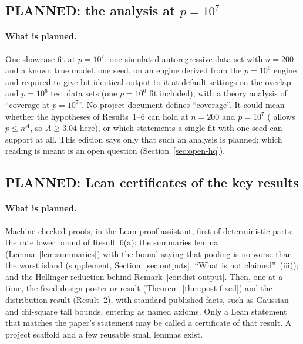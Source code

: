 \subsection{PLANNED: the analysis at \texorpdfstring{$p=10^7$}{p=10\^{}7}}\label{sec:plan-1e7}


\paragraph{What is planned.} One showcase fit at $p=10^7$: one simulated autoregressive data set with $n=200$ and a known
true model, one seed, on an engine derived from the $p=10^6$ engine and required to give bit-identical output to it at default
settings on the overlap and $p=10^6$ test data sets (one $p=10^6$ fit included),
with a theory analysis of ``coverage at $p=10^7$''. No project document defines ``coverage''. It could mean whether the
hypotheses of Results~1--6 can hold at $n=200$ and $p=10^7$ ( allows $p\le n^A$, so $A\ge3.04$ here), or which
statements a single fit with one seed can support at all. This edition says only that such an analysis is planned; which
reading is meant is an open question (Section~\ref{sec:open-hq}).

\subsection{PLANNED: Lean certificates of the key results}\label{sec:plan-lean}


\paragraph{What is planned.} Machine-checked proofs, in the Lean proof assistant, first of deterministic parts: the rate
lower bound of Result~6(a); the summaries lemma (Lemma~\ref{lem:summaries}) with the bound saying that pooling is no worse
than the worst island (supplement, Section~\ref{sec:outputs}, ``What is not claimed''~(iii)); and the Hellinger reduction
behind Remark~\ref{cor:dist-output}. Then, one at a time, the fixed-design posterior result (Theorem~\ref{thm:post-fixed})
and the distribution result (Result~2), with standard published facts, such as Gaussian and chi-square tail bounds, entering
as named axioms. Only a Lean statement that matches the paper's statement may be called a certificate of that result. A
project scaffold and a few reusable small lemmas exist.

